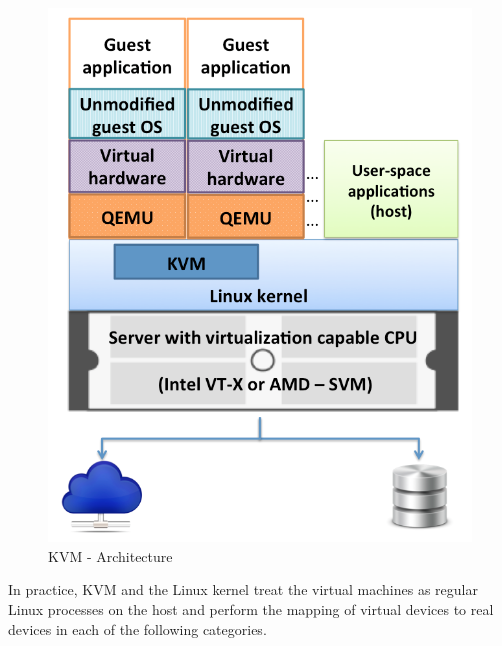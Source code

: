 \newpage 
\begin{figure}[htbp]
\centering
\includegraphics[width=120mm]{kvm-arch2.png}
\caption{KVM - Architecture}
\label{img_kvm_arch}
\end{figure}

In practice, KVM and the Linux kernel treat the virtual machines as regular Linux processes on the host and perform the mapping of virtual devices to real devices in each of the following categories.

